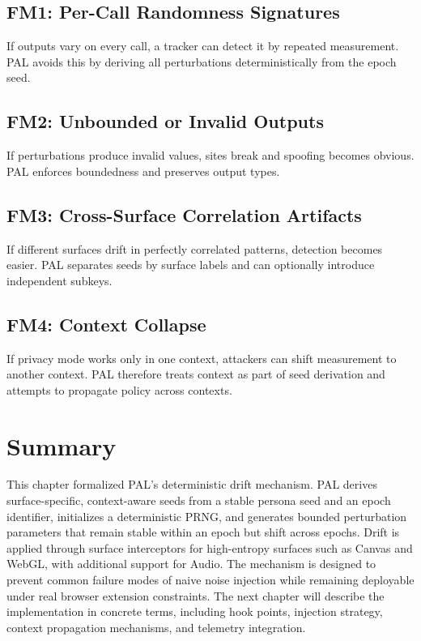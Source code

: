 \documentclass[11pt]{report}
\begin{document}
\subsection{FM1: Per-Call Randomness Signatures}

If outputs vary on every call, a tracker can detect it by repeated measurement. PAL avoids this by deriving all perturbations deterministically from the epoch seed.

\subsection{FM2: Unbounded or Invalid Outputs}

If perturbations produce invalid values, sites break and spoofing becomes obvious. PAL enforces boundedness and preserves output types.

\subsection{FM3: Cross-Surface Correlation Artifacts}

If different surfaces drift in perfectly correlated patterns, detection becomes easier. PAL separates seeds by surface labels and can optionally introduce independent subkeys.

\subsection{FM4: Context Collapse}

If privacy mode works only in one context, attackers can shift measurement to another context. PAL therefore treats context as part of seed derivation and attempts to propagate policy across contexts.

\section{Summary}

This chapter formalized PAL’s deterministic drift mechanism. PAL derives surface-specific, context-aware seeds from a stable persona seed and an epoch identifier, initializes a deterministic PRNG, and generates bounded perturbation parameters that remain stable within an epoch but shift across epochs. Drift is applied through surface interceptors for high-entropy surfaces such as Canvas and WebGL, with additional support for Audio. The mechanism is designed to prevent common failure modes of naive noise injection while remaining deployable under real browser extension constraints. The next chapter will describe the implementation in concrete terms, including hook points, injection strategy, context propagation mechanisms, and telemetry integration.
\end{document}
